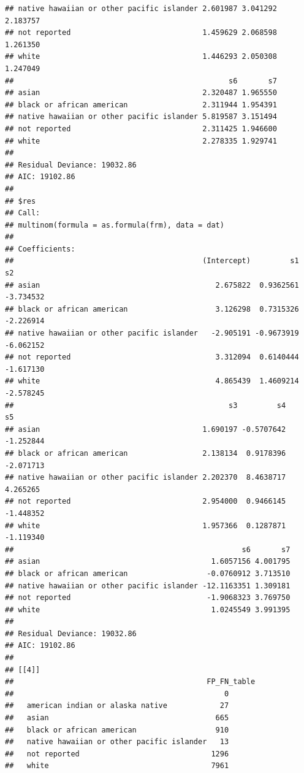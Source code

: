 \documentclass{article}\usepackage[]{graphicx}\usepackage[]{color}
\makeatletter
\newenvironment{kframe}{%
 \def\at@end@of@kframe{}%
 \ifinner\ifhmode%
  \def\at@end@of@kframe{\end{minipage}}%
  \begin{minipage}{\columnwidth}%
 \fi\fi%
 \def\FrameCommand##1{\hskip\@totalleftmargin \hskip-\fboxsep
 \colorbox{shadecolor}{##1}\hskip-\fboxsep
     \hskip-\linewidth \hskip-\@totalleftmargin \hskip\columnwidth}%
 \MakeFramed {\advance\hsize-\width
   \@totalleftmargin\z@ \linewidth\hsize
   \@setminipage}}%
 {\par\unskip\endMakeFramed%
 \at@end@of@kframe}
\newenvironment{knitrout}{}{} %
\makeatother
\begin{document}
\begin{knitrout}
\begin{kframe}
\begin{verbatim}
## native hawaiian or other pacific islander 2.601987 3.041292 2.183757
## not reported                              1.459629 2.068598 1.261350
## white                                     1.446293 2.050308 1.247049
##                                                 s6       s7
## asian                                     2.320487 1.965550
## black or african american                 2.311944 1.954391
## native hawaiian or other pacific islander 5.819587 3.151494
## not reported                              2.311425 1.946600
## white                                     2.278335 1.929741
## 
## Residual Deviance: 19032.86 
## AIC: 19102.86 
## 
## $res
## Call:
## multinom(formula = as.formula(frm), data = dat)
## 
## Coefficients:
##                                           (Intercept)         s1        s2
## asian                                        2.675822  0.9362561 -3.734532
## black or african american                    3.126298  0.7315326 -2.226914
## native hawaiian or other pacific islander   -2.905191 -0.9673919 -6.062152
## not reported                                 3.312094  0.6140444 -1.617130
## white                                        4.865439  1.4609214 -2.578245
##                                                 s3         s4        s5
## asian                                     1.690197 -0.5707642 -1.252844
## black or african american                 2.138134  0.9178396 -2.071713
## native hawaiian or other pacific islander 2.202370  8.4638717  4.265265
## not reported                              2.954000  0.9466145 -1.448352
## white                                     1.957366  0.1287871 -1.119340
##                                                    s6       s7
## asian                                       1.6057156 4.001795
## black or african american                  -0.0760912 3.713510
## native hawaiian or other pacific islander -12.1163351 1.309181
## not reported                               -1.9068323 3.769750
## white                                       1.0245549 3.991395
## 
## Residual Deviance: 19032.86 
## AIC: 19102.86 
## 
## [[4]]
##                                            FP_FN_table
##                                                0
##   american indian or alaska native            27
##   asian                                      665
##   black or african american                  910
##   native hawaiian or other pacific islander   13
##   not reported                              1296
##   white                                     7961
\end{verbatim}
\end{kframe}
\end{knitrout}
\end{document}
